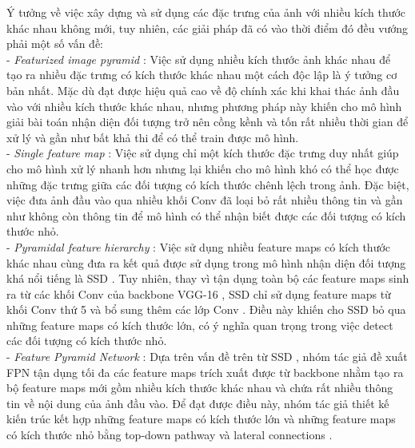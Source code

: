 {    \noindent
    Ý tưởng về việc xây dựng và sử dụng các đặc trưng của ảnh với nhiều kích thước khác nhau không mới, tuy nhiên, các giải pháp đã có vào thời điểm đó đều vướng phải một số vấn đề: \\
    - \textit{Featurized image pyramid} : Việc sử dụng nhiều kích thước ảnh khác nhau để tạo ra nhiều đặc trưng có kích thước khác nhau một cách độc lập là ý tưởng cơ bản nhất. Mặc dù đạt được hiệu quả cao về độ chính xác khi khai thác ảnh đầu vào với nhiều kích thước khác nhau, nhưng phương pháp này khiến cho mô hình giải bài toán nhận diện đối tượng  trở nên cồng kềnh và tốn rất nhiều thời gian để xử lý và gần như bất khả thi để có thể train được mô hình. \\
    - \textit{Single feature map} : Việc sử dụng chỉ một kích thước đặc trưng duy nhất giúp cho mô hình xử lý nhanh hơn nhưng lại khiến cho mô hình khó có thể học được những đặc trưng giữa các đối tượng có kích thước chênh lệch trong ảnh. Đặc biệt, việc đưa ảnh đầu vào qua nhiều khối Conv đã loại bỏ rất nhiều thông tin và gần như không còn thông tin để mô hình có thể nhận biết được các đối tượng có kích thước nhỏ. \\
    - \textit{Pyramidal feature hierarchy} : Việc sử dụng nhiều feature maps  có kích thước khác nhau cùng đưa ra kết quả được sử dụng trong mô hình nhận diện đối tượng  khá nổi tiếng là SSD  \cite{liu2016ssd}. Tuy nhiên, thay vì tận dụng toàn bộ các feature maps  sinh ra từ các khối Conv của backbone  VGG-16 , SSD  chỉ sử dụng feature maps  từ khối Conv thứ 5 và bổ sung thêm các lớp Conv . Điều này khiến cho SSD  bỏ qua những feature maps  có kích thước lớn, có ý nghĩa quan trọng trong việc detect các đối tượng có kích thước nhỏ. \\
    - \textit{Feature Pyramid Network} : Dựa trên vấn đề trên từ SSD , nhóm tác giả đề xuất FPN  tận dụng tối đa các feature maps  trích xuất được từ backbone  nhằm tạo ra bộ feature maps  mới gồm nhiều kích thước khác nhau và chứa rất nhiều thông tin về nội dung của ảnh đầu vào. Để đạt được điều này, nhóm tác giả thiết kế kiến trúc kết hợp những feature maps  có kích thước lớn và những feature maps  có kích thước nhỏ bằng top-down pathway  và lateral connections .

}
